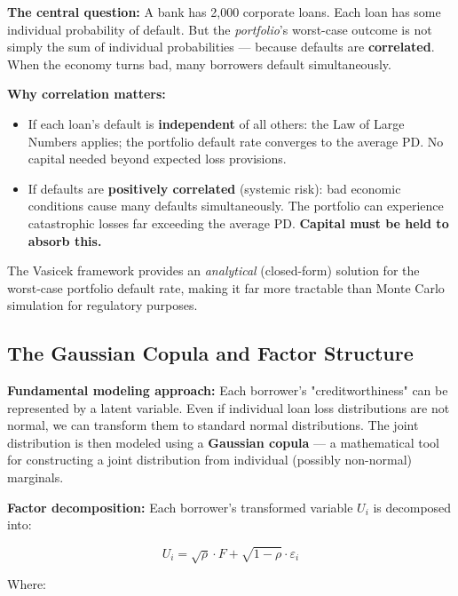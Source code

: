 \documentclass[12pt,openany]{book}
\theoremstyle{definition}
\theoremstyle{remark}
\begin{document}
\textbf{The central question:} A bank has 2,000 corporate loans. Each loan has some individual probability of default. But the \emph{portfolio}'s worst-case outcome is not simply the sum of individual probabilities --- because defaults are \textbf{correlated}. When the economy turns bad, many borrowers default simultaneously.

\textbf{Why correlation matters:}

\begin{itemize}
\item If each loan's default is \textbf{independent} of all others: the Law of Large Numbers applies; the portfolio default rate converges to the average PD. No capital needed beyond expected loss provisions.


\item If defaults are \textbf{positively correlated} (systemic risk): bad economic conditions cause many defaults simultaneously. The portfolio can experience catastrophic losses far exceeding the average PD. \textbf{Capital must be held to absorb this.}


\end{itemize}
The Vasicek framework provides an \emph{analytical} (closed-form) solution for the worst-case portfolio default rate, making it far more tractable than Monte Carlo simulation for regulatory purposes.

\medskip
\subsection{The Gaussian Copula and Factor Structure}
\textbf{Fundamental modeling approach:} Each borrower's "creditworthiness" can be represented by a latent variable. Even if individual loan loss distributions are not normal, we can transform them to standard normal distributions. The joint distribution is then modeled using a \textbf{Gaussian copula} --- a mathematical tool for constructing a joint distribution from individual (possibly non-normal) marginals.

\textbf{Factor decomposition:} Each borrower's transformed variable $U_i$ is decomposed into:

\[
\boxed{U_i = \sqrt{\rho} \cdot F + \sqrt{1-\rho} \cdot \varepsilon_i}
\]

Where:
\end{document}
